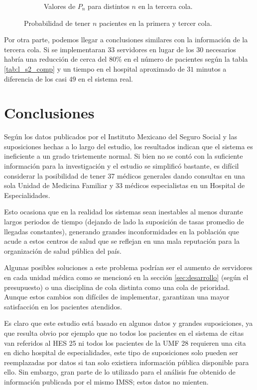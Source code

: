 \documentclass[10pt]{article}
\begin{document}
\begin{figure}[!ht]
\begin{subfigure}[c]{0.48\linewidth}
    		\caption{Valores de $P_{n}$ para distintos $n$ en la tercera cola.}
    		\label{fig:pn_s2}
    	\end{subfigure}
    	\caption{Probabilidad de tener $n$ pacientes en la primera y tercer cola.}
    	\label{fig:pn_graficas}
    \end{figure}
    
    Por otra parte, podemos llegar a conclusiones similares con la información de la tercera cola. Si se implementaran $33$ servidores en lugar de los $30$ necesarios habría una reducción de cerca del 80\% en el número de pacientes según la tabla \ref{tab:l_s2_comp} y un tiempo en el hospital aproximado de $31$ minutos a diferencia de los casi $49$ en el sistema real.
    
    \section{Conclusiones}
    Según los datos publicados por el Instituto Mexicano del Seguro Social y las suposiciones hechas a lo largo del estudio, los resultados indican que el sistema es ineficiente a un grado tristemente normal. Si bien no se contó con la suficiente información para la investigación y el estudio se simplificó bastante, es difícil considerar la posibilidad de tener 37 médicos generales dando consultas en una sola Unidad de Medicina Familiar y 33 médicos especialistas en un Hospital de Especialidades.
    
    Esto ocasiona que en la realidad los sistemas sean inestables al menos durante largos periodos de tiempo (dejando de lado la suposición de tasas promedio de llegadas constantes), generando grandes inconformidades en la población que acude a estos centros de salud que se reflejan en una mala reputación para la organización de salud pública del país.
    
    Algunas posibles soluciones a este problema podrían ser el aumento de servidores en cada unidad médica como se mencionó en la sección \ref{sec:desarrollo} (según el presupuesto) o una disciplina de cola distinta como una cola de prioridad. Aunque estos cambios son difíciles de implementar, garantizan una mayor satisfacción en los pacientes atendidos.
    
    Es claro que este estudio está basado en algunos datos y grandes suposiciones, ya que resulta obvio por ejemplo que no todos los pacientes en el sistema de citas van referidos al HES 25 ni todos los pacientes de la UMF 28 requieren una cita en dicho hospital de especialidades, este tipo de suposiciones solo pueden ser reemplazadas por datos si tan solo existiera información pública disponible para ello. Sin embargo, gran parte de lo utilizado para el análisis fue obtenido de información publicada por el mismo IMSS; estos datos no mienten.
    
\end{document}
